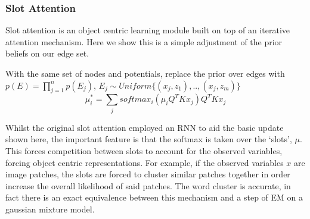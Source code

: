 \documentclass{article}
\theoremstyle{plain}
\theoremstyle{definition}
\theoremstyle{remark}
\begin{document}
\subsubsection{Slot Attention}
Slot attention \cite{locatello_object-centric_2020} is an object centric learning module built on top of an iterative attention mechanism. Here we show this is a simple adjustment of the prior beliefs on our edge set.

With the same set of nodes and potentials, replace the prior over edges with 
$p(E) = \prod_{j=1}^n p(E_j)$, $E_j \sim Uniform\{(x_j, z_1),..,(x_j, z_m)\}$
\begin{equation*}
    \mu_i^{*} =  \sum_{j} softmax_i(\mu_iQ^TKx_j)Q^T K x_j
\end{equation*}

Whilst the original slot attention employed an RNN to aid the basic update shown here, the important feature is that the softmax is taken over the `slots', $\mu$. This forces competition between slots to account for the observed variables, forcing object centric representations. For example, if the observed variables $x$ are image patches, the slots are forced to cluster similar patches together in order increase the overall likelihood of said patches. The word cluster is accurate, in fact there is an exact equivalence between this mechanism and a step of EM on a gaussian mixture model.


\end{document}
